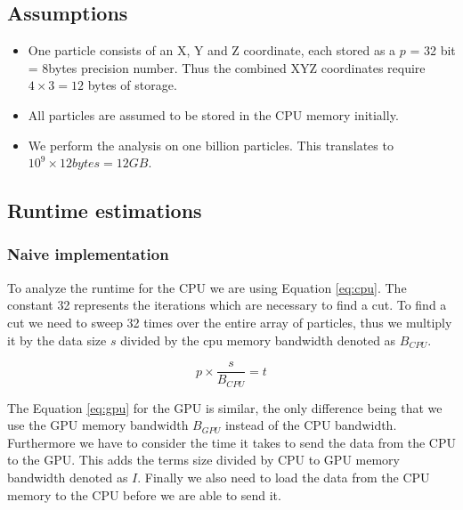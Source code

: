 \documentclass[]{article}
\begin{document}



\subsection{Assumptions} 
\begin{itemize}
	\item
	One particle consists of an X, Y and Z coordinate, each stored as a $p$ = 32 bit = 8bytes precision number. Thus the combined  XYZ coordinates require $4\times3 = 12$ bytes of storage.
	
	\item 
	All particles are assumed to be stored in the CPU memory initially.
	
	\item
	We perform the analysis on one billion particles. This translates to $10^9 \times  12 bytes = 12 GB$.

\end{itemize}

\subsection{Runtime estimations}


\subsubsection{Naive implementation}

To analyze the runtime for the CPU we are using Equation \ref{eq:cpu}. The constant 32 represents the iterations which are necessary to find a cut. To find a cut we need to sweep 32 times over the entire array of particles, thus we multiply it by the data size $s$ divided by the cpu memory bandwidth denoted as $B_{CPU}$.

\begin{center}
	\begin{equation}
			p \times \frac{ s }{B_{CPU}} = t
			\label{eq:cpu}
	\end{equation}
\end{center}

\vspace{5mm}


The Equation \ref{eq:gpu} for the GPU is similar, the only difference being that we use the GPU memory bandwidth $B_{GPU}$ instead of the CPU bandwidth. Furthermore we have to consider the time it takes to send the data from the CPU to the GPU. This adds the terms size divided by CPU to GPU memory bandwidth denoted as $I$. Finally we also need to load the data from the CPU memory to the CPU before we are able to send it. 
\end{document}
